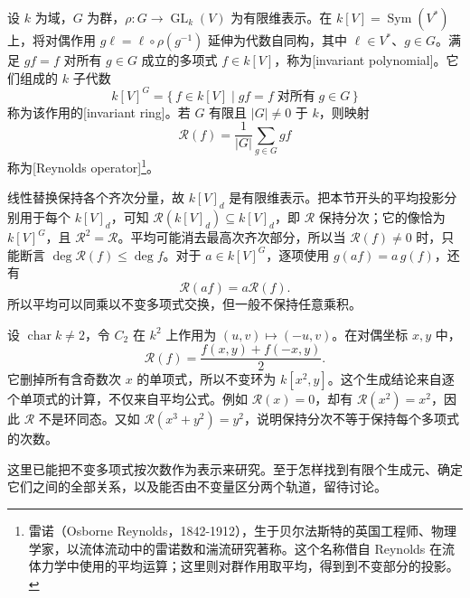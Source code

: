 \begin{definition}\label{b5:def:polynomial-invariant-ring}
	设 \(k\) 为域，\(G\) 为群，\(\rho:G\to\operatorname{GL}_k(V)\) 为有限维表示。在 \(k[V]=\operatorname{Sym}(V^*)\) 上，将对偶作用 \(g\ell=\ell\circ\rho(g^{-1})\) 延伸为代数自同构，其中 \(\ell\in V^*\)、\(g\in G\)。满足 \(gf=f\) 对所有 \(g\in G\) 成立的多项式 \(f\in k[V]\)，称为[invariant polynomial]。它们组成的 \(k\) 子代数
	\[
		k[V]^G=\bigl\{\,f\in k[V]\mid gf=f\;\text{对所有}\;g\in G\,\bigr\}
	\]
	称为该作用的[invariant ring]。若 \(G\) 有限且 \(|G|\ne0\) 于 \(k\)，则映射
	\[
		\mathcal R(f)=\frac1{|G|}\sum_{g\in G}gf
	\]
	称为[Reynolds operator]\footnote{雷诺（Osborne Reynolds，1842-1912），生于贝尔法斯特的英国工程师、物理学家，以流体流动中的雷诺数和湍流研究著称。这个名称借自 Reynolds 在流体力学中使用的平均运算；这里则对群作用取平均，得到到不变部分的投影。}。
\end{definition}

线性替换保持各个齐次分量，故 \(k[V]_d\) 是有限维表示。把本节开头的平均投影分别用于每个 \(k[V]_d\)，可知 \(\mathcal R(k[V]_d)\subseteq k[V]_d\)，即 \(\mathcal R\) 保持分次；它的像恰为 \(k[V]^G\)，且 \(\mathcal R^2=\mathcal R\)。平均可能消去最高次齐次部分，所以当 \(\mathcal R(f)\ne0\) 时，只能断言 \(\deg\mathcal R(f)\le\deg f\)。对于 \(a\in k[V]^G\)，逐项使用 \(g(af)=a\,g(f)\)，还有
\[
	\mathcal R(af)=a\mathcal R(f).
\]
所以平均可以同乘以不变多项式交换，但一般不保持任意乘积。

\begin{example}\label{b5:exm:reynolds-reflection}
	设 \(\operatorname{char}k\ne2\)，令 \(C_2\) 在 \(k^2\) 上作用为 \((u,v)\mapsto(-u,v)\)。在对偶坐标 \(x,y\) 中，
	\[
		\mathcal R(f)=\frac{f(x,y)+f(-x,y)}2.
	\]
	它删掉所有含奇数次 \(x\) 的单项式，所以不变环为 \(k[x^2,y]\)。这个生成结论来自逐个单项式的计算，不仅来自平均公式。例如 \(\mathcal R(x)=0\)，却有 \(\mathcal R(x^2)=x^2\)，因此 \(\mathcal R\) 不是环同态。又如 \(\mathcal R(x^3+y^2)=y^2\)，说明保持分次不等于保持每个多项式的次数。
\end{example}

这里已能把不变多项式按次数作为表示来研究。至于怎样找到有限个生成元、确定它们之间的全部关系，以及能否由不变量区分两个轨道，留待讨论。
